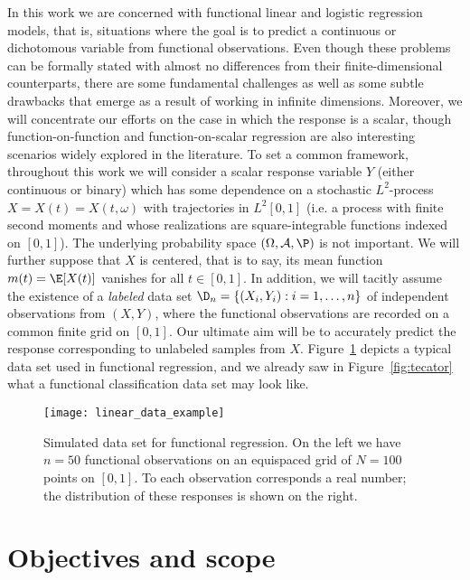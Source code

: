 In this work we are concerned with functional linear and logistic regression models, that is, situations where the goal is to predict a continuous or dichotomous variable from functional observations. Even though these problems can be formally stated with almost no differences from their finite-dimensional counterparts, there are some fundamental challenges as well as some subtle drawbacks that emerge as a result of working in infinite dimensions. Moreover, we will concentrate our efforts on the case in which the response is a scalar, though function-on-function and function-on-scalar regression are also interesting scenarios widely explored in the literature. To set a common framework, throughout this work we will consider a scalar response variable \(Y\) (either continuous or binary) which has some dependence on a stochastic \(L^2\)-process \(X=X(t)=X(t, \omega)\) with trajectories in \(L^2[0, 1]\) (i.e. a process with finite second moments and whose realizations are square-integrable functions indexed on \([0,1]\)). The underlying probability space \((\Omega, \mathcal A, \P)\) is not important. We will further suppose that \(X\) is centered, that is to say, its mean function \(m(t)=\E[X(t)]\) vanishes for all \(t\in[0,1]\). In addition, we will tacitly assume the existence of a \textit{labeled} data set \(\D_n =\{(X_i, Y_i): i=1,\dots, n\}\) of independent observations from \((X, Y)\), where the functional observations are recorded on a common finite grid on \([0, 1]\). Our ultimate aim will be to accurately predict the response corresponding to unlabeled samples from \(X\). Figure~\ref{fig:linear_data_example} depicts a typical data set used in functional regression, and we already saw in Figure~\ref{fig:tecator} what a functional classification data set may look like.

\enlargethispage{1\baselineskip}

\begin{figure}[htbp!]
  \centering
  \texttt{[image: linear\_data\_example]}
  \caption{Simulated data set for functional regression. On the left we have \(n=50\) functional observations on an equispaced grid of \(N=100\) points on \([0,1]\). To each observation corresponds a real number; the distribution of these responses is shown on the right.}\label{fig:linear_data_example}
\end{figure}


\section{Objectives and scope}

